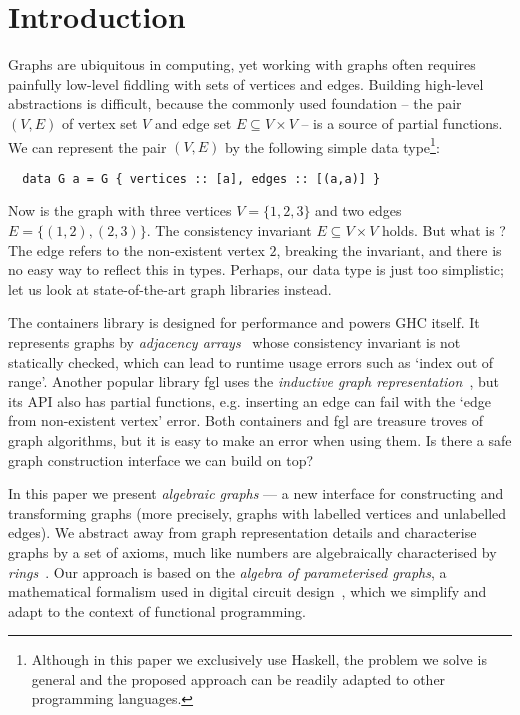 \vspace{-2mm}
\section{Introduction}\label{sec-intro}
\vspace{-0.5mm}

Graphs are ubiquitous in computing, yet working with graphs often requires
painfully low-level fiddling with sets of vertices and edges. Building high-level
abstractions is difficult, because the commonly used foundation -- the pair $(V, E)$
of vertex set $V$ and edge set $E \subseteq V \times V$ -- is a source of partial
functions. We can represent the pair $(V, E)$ by the following simple data
type\footnote{Although in this paper we exclusively use Haskell, the problem we solve is
general and the proposed approach can be readily adapted to other programming languages.}:

\vspace{0.5mm}
\begin{verbatim}
  data G a = G { vertices :: [a], edges :: [(a,a)] }
\end{verbatim}
\vspace{0.5mm}

\noindent
Now  is the graph with three vertices $V = \{1,2,3\}$ and
two edges $E = \{(1,2), (2,3)\}$. The consistency invariant $E \subseteq V \times V$ holds.
But what is ? The edge refers to the non-existent vertex $2$, breaking the
invariant, and there is no easy way to reflect this in types. Perhaps, our data type is just
too simplistic; let us look at state-of-the-art graph libraries instead.

The \textsf{containers} library is designed for performance and powers GHC itself.
It represents graphs by \emph{adjacency arrays}~\cite{1995_king_graphs} whose
consistency invariant is not statically checked, which can lead to runtime
usage errors such as \textsf{`index out of range'}. Another popular library \textsf{fgl} uses
the \emph{inductive graph representation}~\cite{2001_erwig_inductive}, but its API also
has partial functions, e.g. inserting an edge can fail with the \textsf{`edge from
non-existent vertex'} error.
Both \textsf{containers} and \textsf{fgl} are treasure troves of graph algorithms,
but it is easy to make an error when using them. Is there a safe graph construction
interface we can build on top?

In this paper we present \emph{algebraic graphs} --- a new interface for constructing
and transforming graphs (more precisely, graphs with labelled vertices and unlabelled
edges). We abstract away from graph representation details and characterise graphs by a
set of axioms, much like numbers are algebraically characterised by
\emph{rings}~\cite{1999_maclane_algebra}. Our approach is based on the
\emph{algebra of parameterised graphs}, a mathematical formalism used in digital
circuit design~\cite{2014_algebra_mokhov}, which we simplify and adapt to the
context of functional programming.

